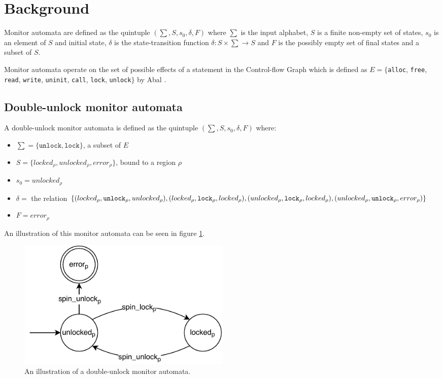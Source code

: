 \section{Background}

Monitor automata are defined as the quintuple $(\sum, S, s_0, \delta, F)$ where $\sum$ is the input alphabet, $S$ is a finite non-empty set of states, $s_0$ is an element of $S$ and initial state, $\delta$ is the state-transition function $\delta: S \times \sum \rightarrow S$ and $F$ is the possibly empty set of final states and a subset of $S$.

\newpar Monitor automata operate on the set of possible effects of a statement in the Control-flow Graph which is defined as $E = \{$\texttt{alloc}, \texttt{free}, \texttt{read}, \texttt{write}, \texttt{uninit}, \texttt{call}, \texttt{lock}, \texttt{unlock}$\}$ by Abal \cite{EffectiveBugFinding}. 

\subsection{Double-unlock monitor automata}

A double-unlock monitor automata is defined as the quintuple $(\sum, S, s_0, \delta, F)$ where: 

\begin{itemize}
    \item $\sum = \{\texttt{unlock}, \texttt{lock}\}$, a subset of $E$
    \item $S = \{ locked_\rho, unlocked_\rho, error_\rho \}$, bound to a region $\rho$
    \item $s_0 = unlocked_\rho$ 
    \item $\delta =$ the relation $\{(locked_\rho, \texttt{unlock}_\rho, unlocked_\rho), (locked_\rho, \texttt{lock}_\rho, locked_\rho), \\
        (unlocked_\rho, \texttt{lock}_\rho, locked_\rho), (unlocked_\rho, \texttt{unlock}_\rho, error_\rho)\}$ 
    \item $F = error_\rho$  
\end{itemize}

An illustration of this monitor automata can be seen in figure \ref{double-unlock-automata}. 

\begin{figure}[H]
    \centering
    \includegraphics[width=0.5\textwidth]{background/figures/double-unlock}
    \caption{An illustration of a double-unlock monitor automata.}
    \label{double-unlock-automata}
\end{figure}
    
